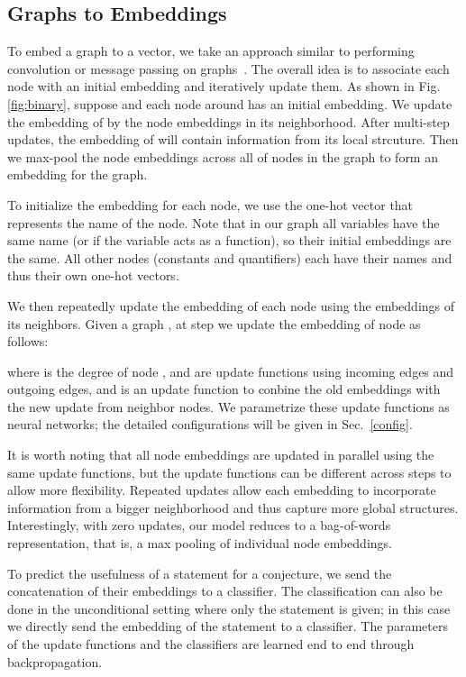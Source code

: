 \documentclass{article}
\begin{document}
\subsection{Graphs to Embeddings} \label{sec:emb}

To embed a graph to a vector, we take an approach similar to performing convolution or
message passing on graphs~\cite{duvenaud2015convolutional}. The overall idea is to
associate each node with an initial embedding and iteratively update them. As shown in Fig. \ref{fig:binary},
suppose   and each node around  has an initial embedding. We update the embedding of  by the node
embeddings in its neighborhood. After multi-step updates, the embedding of  will contain information from its local strcuture.
Then we max-pool the node embeddings across all of nodes in the graph to form an embedding for the graph. 

To initialize the embedding for each node, we use the one-hot vector that represents the
name of the node. Note that in our graph all variables have the
same name  (or  if the variable acts as a function), so their initial embeddings are the
 same. All other nodes (constants and quantifiers) each have their
names and thus their own one-hot vectors. 

We then repeatedly update the embedding of each node using the embeddings of its
neighbors. Given a graph , at step  we update the embedding  of node 
as follows: 
 
where  is the degree of node ,  and  are update functions using incoming
edges and outgoing edges, and  is an update function to conbine the old embeddings with the new update from neighbor nodes.  We parametrize these update functions as neural networks; the
detailed configurations will be given in Sec.~\ref{config}.

It is worth noting that all node embeddings are updated in parallel using the same update
functions, but the update functions can be different across steps to allow more flexibility. Repeated updates allow each embedding to incorporate information from a bigger neighborhood and thus
capture more global structures. Interestingly, with zero updates, our model reduces to a bag-of-words
representation, that is, a max pooling of individual node embeddings. 

To predict the usefulness of a statement for a conjecture, we send the concatenation of
their embeddings to a classifier. The classification can also be done in the
unconditional setting where only the statement is given; in this case we directly
send the embedding of the statement to a classifier. The parameters of the update
functions and the classifiers are learned end to end through
backpropagation. 
\end{document}
